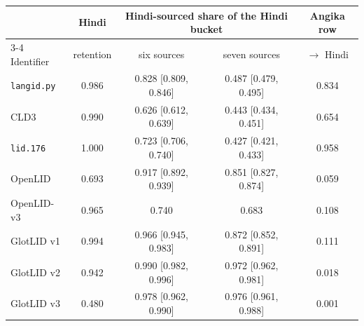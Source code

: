 \begin{tabular}{lcccc}
\toprule
 & Hindi & \multicolumn{2}{c}{Hindi-sourced share of the Hindi bucket} & Angika row\\
\cmidrule(lr){3-4}
Identifier & retention & six sources & seven sources & $\rightarrow$ Hindi\\
\midrule
\texttt{langid.py} & 0.986 & 0.828 [0.809, 0.846] & 0.487 [0.479, 0.495] & 0.834\\
CLD3 & 0.990 & 0.626 [0.612, 0.639] & 0.443 [0.434, 0.451] & 0.654\\
\texttt{lid.176} & 1.000 & 0.723 [0.706, 0.740] & 0.427 [0.421, 0.433] & 0.958\\
OpenLID & 0.693 & 0.917 [0.892, 0.939] & 0.851 [0.827, 0.874] & 0.059\\
OpenLID-v3 & 0.965 & 0.740 & 0.683 & 0.108\\
GlotLID v1 & 0.994 & 0.966 [0.945, 0.983] & 0.872 [0.852, 0.891] & 0.111\\
GlotLID v2 & 0.942 & 0.990 [0.982, 0.996] & 0.972 [0.962, 0.981] & 0.018\\
GlotLID v3 & 0.480 & 0.978 [0.962, 0.990] & 0.976 [0.961, 0.988] & 0.001\\
\bottomrule
\end{tabular}
